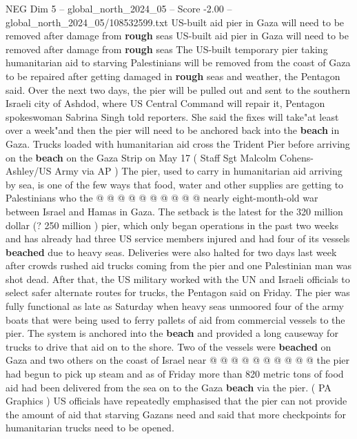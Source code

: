 \begin{textsample}{NEG Dim 5 – global\_north\_2024\_05 – Score -2.00 – global\_north\_2024\_05/108532599.txt}  \label{ex:f5_neg_286}
US-built aid pier in Gaza will need to be removed after damage from \textbf{rough} seas US-built aid pier in Gaza will need to be removed after damage from \textbf{rough} seas The US-built temporary pier taking humanitarian aid to starving Palestinians will be removed from the coast of Gaza to be repaired after getting damaged in \textbf{rough} seas and weather, the Pentagon said.
Over the next two days, the pier will be pulled out and sent to the southern Israeli city of Ashdod, where US Central Command will repair it, Pentagon spokeswoman Sabrina Singh told reporters.
She said the fixes will take"at least over a week"and then the pier will need to be anchored back into the \textbf{beach} in Gaza.
Trucks loaded with humanitarian aid cross the Trident Pier before arriving on the \textbf{beach} on the Gaza Strip on May 17 ( Staff Sgt Malcolm Cohens-Ashley/US Army via AP ) The pier, used to carry in humanitarian aid arriving by sea, is one of the few ways that food, water and other supplies are getting to Palestinians who the @ @ @ @ @ @ @ @ @ @ nearly eight-month-old war between Israel and Hamas in Gaza.
The setback is the latest for the 320 million dollar (? 250 million ) pier, which only began operations in the past two weeks and has already had three US service members injured and had four of its vessels \textbf{beached} due to heavy seas.
Deliveries were also halted for two days last week after crowds rushed aid trucks coming from the pier and one Palestinian man was shot dead.
After that, the US military worked with the UN and Israeli officials to select safer alternate routes for trucks, the Pentagon said on Friday.
The pier was fully functional as late as Saturday when heavy seas unmoored four of the army boats that were being used to ferry pallets of aid from commercial vessels to the pier.
The system is anchored into the \textbf{beach} and provided a long causeway for trucks to drive that aid on to the shore.
Two of the vessels were \textbf{beached} on Gaza and two others on the coast of Israel near @ @ @ @ @ @ @ @ @ @ the pier had begun to pick up steam and as of Friday more than 820 metric tons of food aid had been delivered from the sea on to the Gaza \textbf{beach} via the pier. ( PA Graphics ) US officials have repeatedly emphasised that the pier can not provide the amount of aid that starving Gazans need and said that more checkpoints for humanitarian trucks need to be opened.

\end{textsample}
